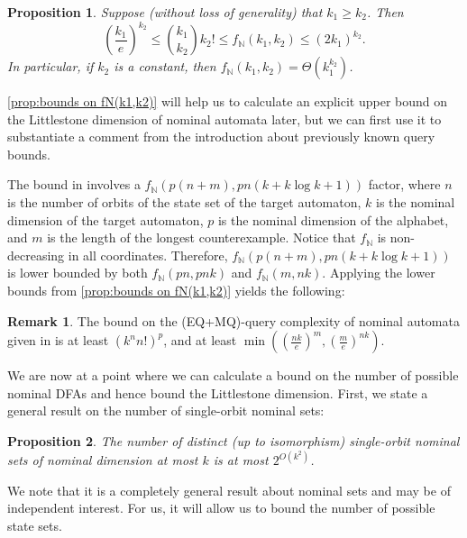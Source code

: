 \documentclass[11pt,a4paper]{amsart}
\newtheorem{proposition}{Proposition}
\theoremstyle{definition}
\newtheorem{remark}{Remark}
\newcommand{\bb}{\mathbb}
\newif\ifappendix
\begin{document}
\begin{proposition} \label{prop:bounds on fN(k1,k2)}
    Suppose (without loss of generality) that $k_1 \geq k_2$. 
    Then 
    \[
        \left(\frac{k_1}{e}\right)^{k_2} \leq \binom{k_1}{k_2} k_2! \leq f_{\bb N}(k_1, k_2) \leq (2k_1)^{k_2}.
    \]
    In particular, if $k_2$ is a constant, then $f_{\bb N}(k_1, k_2) = \Theta(k_1^{k_2})$.
\end{proposition}

\ifappendix The proof of \autoref{prop:bounds on fN(k1,k2)} is given in Appendix \ref{appendix:proof of bounds on fN(k1,k2)}. \fi
\autoref{prop:bounds on fN(k1,k2)} will help us to calculate an explicit upper bound on the Littlestone dimension of nominal automata later, but we can first use it to substantiate a comment from the introduction about previously known query bounds.

The bound in \cite[Corollary 1]{moerman-etal:learning-nominal-automata} involves a $f_{\bb N}(p(n+m), pn(k+k\log k+1))$ factor, where $n$ is the number of orbits of the state set of the target automaton, $k$ is the nominal dimension of the target automaton, $p$ is the nominal dimension of the alphabet, and $m$ is the length of the longest counterexample.
Notice that $f_{\bb N}$ is non-decreasing in all coordinates. 
Therefore, $f_{\bb N}(p(n+m), pn(k+k\log k+1))$ is lower bounded by both $f_{\bb N}(pn, pnk)$ and $f_{\bb N}(m, nk)$.
Applying the lower bounds from \autoref{prop:bounds on fN(k1,k2)} yields the following:
\begin{remark} \label{remark:factorial bounds in moerman etal}
    The bound on the (EQ+MQ)-query complexity of nominal automata given in \cite[Corollary 1]{moerman-etal:learning-nominal-automata} is at least $(k^n n!)^p$, and at least $\min\left(\left(\frac{nk}{e}\right)^m, \left(\frac{m}{e}\right)^{nk}\right)$.
\end{remark}


We are now at a point where we can calculate a bound on the number of possible nominal DFAs and hence bound the Littlestone dimension. 
First, we state a general result on the number of single-orbit nominal sets:

\begin{proposition} \label{prop:number of single orbit nominal sets}
    The number of distinct (up to isomorphism) single-orbit nominal sets of nominal dimension at most $k$ is at most $2^{O(k^2)}$.
\end{proposition}

\ifappendix The proof of \autoref{prop:number of single orbit nominal sets} is given in Appendix \ref{appendix:proof of number of single orbit nominal sets}. \fi
We note that it is a completely general result about nominal sets and may be of independent interest.
For us, it will allow us to bound the number of possible state sets.
\end{document}
